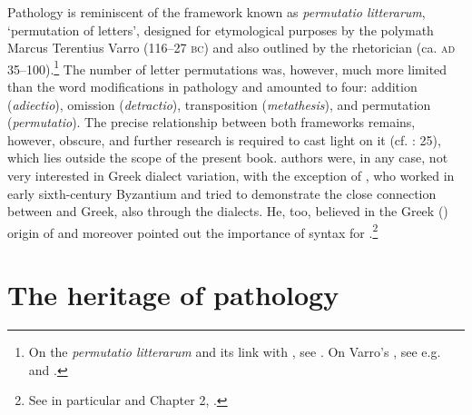 Pathology is reminiscent of the  framework known as \textit{permutatio litterarum}, ‘permutation of letters’, designed for etymological purposes by the polymath Marcus Terentius Varro (116–27 \textsc{bc}) and also outlined by the rhetorician  (ca. \textsc{ad} 35–100).\footnote{{On the} {\textit{permutatio litterarum} }{and its link with , see \citet[esp. 25–28, 37]{Ax1987}. On Varro’s , see e.g. \citet{Pfaffel1981} and \citet[7--10, {\textit{passim}}]{Taylor1996}.}} The number of letter permutations was, however, much more limited than the word modifications in pathology and amounted to four: addition (\textit{adiectio}), omission (\textit{detractio}), transposition (\textit{metathesis}), and permutation (\textit{permutatio}). The precise relationship between both frameworks remains, however, obscure, and further research is required to cast light on it (cf. \citealt{Ax1987}: 25), which lies outside the scope of the present book.  authors were, in any case, not very interested in Greek dialect variation, with the exception of , who worked in early sixth-century Byzantium and tried to demonstrate the close connection between  and Greek, also through the dialects. He, too, believed in the Greek () origin of  and moreover pointed out the importance of  syntax for .\footnote{{See in particular \citet[]{Conduche_latin_nodate} and Chapter 2, .}}


\section{The heritage of pathology}\label{sec:6.2}

